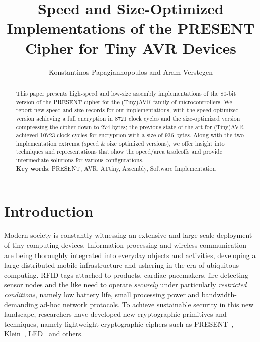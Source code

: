 \documentclass[11pt]{llncs2e} %
\begin{document}
\title{Speed and Size-Optimized Implementations of the PRESENT Cipher for Tiny AVR Devices}

\author{Konstantinos Papagiannopoulos and Aram Verstegen}
\maketitle

\begin{abstract}
This paper presents high-speed and low-size assembly implementations of the 80-bit version of the PRESENT cipher for the (Tiny)AVR family of microcontrollers. We report new speed and size records for our implementations, with the speed-optimized version achieving a full encryption in 8721 clock cycles and the size-optimized version compressing the cipher down to 274 bytes; the previous state of the art for (Tiny)AVR achieved 10723 clock cycles for encryption with a size of 936 bytes. Along with the two implementation extrema (speed \& size optimized versions), we offer insight into techniques and representations that show the speed/area tradeoffs and provide intermediate solutions for various configurations.\\
\textbf{Key words}: PRESENT, AVR, ATtiny, Assembly, Software Implementation
\end{abstract}
\section{Introduction}
Modern society is constantly witnessing an extensive and large scale deployment of tiny computing devices. Information processing and wireless communication are being thoroughly integrated into everyday objects and activities, developing a large distributed mobile infrastructure and ushering in the era of ubiquitous computing. RFID tags attached to products, cardiac pacemakers, fire-detecting sensor nodes and the like need to operate \emph{securely} under particularly \emph{restricted conditions}, namely low battery life, small processing power and bandwidth-demanding ad-hoc network protocols. To achieve sustainable security in this new landscape, researchers have developed new cryptographic primitives and techniques, namely lightweight cryptographic ciphers such as PRESENT~\cite{bogdanov2007present}, Klein~\cite{gong2012klein}, LED~\cite{guo2011led} and others.
\end{document}
